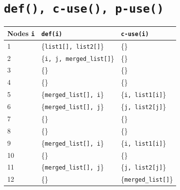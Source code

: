\documentclass[11pt, oneside]{article}   	%
\begin{document}
\newpage
\section{\texttt{def(), c-use(), p-use()}}
\begin{table}[H]
	\begin{tabular}{|l|l|l|}
		\hline
		Nodes \texttt{i} & \texttt{def(i)}                       & \texttt{c-use(i)}               \\ \hline
		1                & \{\texttt{list1{[}{]}, list2{[}{]}}\} & \{\}                            \\ \hline
		2                & \{\texttt{i, j, merged\_list{[}{]}}\} & \{\}                            \\ \hline
		3                & \{\}                                  & \{\}                            \\ \hline
		4                & \{\}                                  & \{\}                            \\ \hline
		5                & \{\texttt{merged\_list{[}{]}, i}\}    & \{\texttt{i, list1{[}i{]}}\}    \\ \hline
		6                & \{\texttt{merged\_list{[}{]}, j}\}    & \{\texttt{j, list2{[}j{]}}\}    \\ \hline
		7                & \{\}                                  & \{\}                            \\ \hline
		8                & \{\}                                  & \{\}                            \\ \hline
		9                & \{\texttt{merged\_list{[}{]}, i}\}    & \{\texttt{i, list1{[}i{]}}\}    \\ \hline
		10               & \{\}                                  & \{\}                            \\ \hline
		11               & \{\texttt{merged\_list{[}{]}, j}\}    & \{\texttt{j, list2{[}j{]}}\}    \\ \hline
		12               & \{\}                                  & \{\texttt{merged\_list{[}{]}}\} \\ \hline
	\end{tabular}
\end{table}
\end{document}
